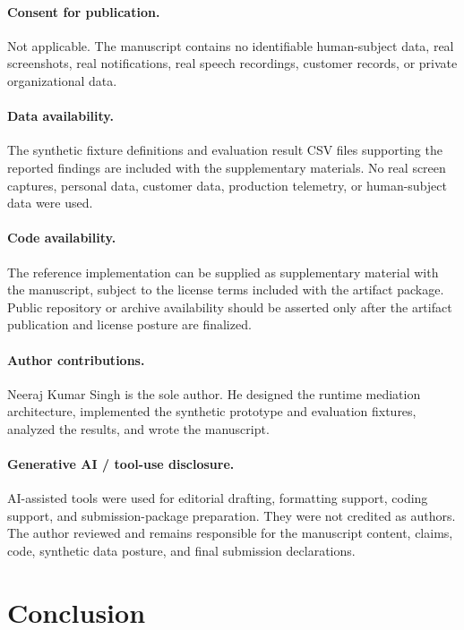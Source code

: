 \documentclass[sn-mathphys-num]{sn-jnl}
\begin{document}
\paragraph{Consent for publication.}
Not applicable. The manuscript contains no identifiable human-subject data,
real screenshots, real notifications, real speech recordings, customer records,
or private organizational data.

\paragraph{Data availability.}
The synthetic fixture definitions and evaluation result CSV files supporting
the reported findings are included with the supplementary materials. No real
screen captures, personal data, customer data, production telemetry, or
human-subject data were used.

\paragraph{Code availability.}
The reference implementation can be supplied as supplementary material with the
manuscript, subject to the license terms included with the artifact package.
Public repository or archive availability should be asserted only after the
artifact publication and license posture are finalized.

\paragraph{Author contributions.}
Neeraj Kumar Singh is the sole author. He designed the runtime mediation
architecture, implemented the synthetic prototype and evaluation fixtures,
analyzed the results, and wrote the manuscript.

\paragraph{Generative AI / tool-use disclosure.}
AI-assisted tools were used for editorial drafting, formatting support, coding
support, and submission-package preparation. They were not credited as authors.
The author reviewed and remains responsible for the manuscript content, claims,
code, synthetic data posture, and final submission declarations.

\section{Conclusion}\label{sec:conclusion}
\end{document}
